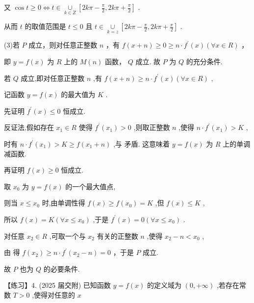 \documentclass[10pt]{article}
\newcommand*\circled[1]{\tikz[baseline=(char.base)]{\node[shape=circle,draw,inner sep=1.5pt] (char) {\small #1};}}
\begin{document}
又 \(\cos t \geq  0 \Leftrightarrow  t \in  \underset{k \in  Z}{ \cup  }\left\lbrack  {{2k\pi } - \frac{\pi }{2},{2k\pi } + \frac{\pi }{2}}\right\rbrack\) .

从而 \(t\) 的取值范围是 \(t \leq  0\) 且 \(t \in  \underset{k = z}{ \cup  }\left\lbrack  {{2k\pi } - \frac{\pi }{2},{2k\pi } + \frac{\pi }{2}}\right\rbrack\) .

(3)若 \(P\) 成立，则对任意正整数 \(n\) ，有 \(f\left( {x + n}\right)  \geq  0 \geq  n \cdot  {f}^{\prime }\left( x\right) \left( {\forall x \in  R}\right)\) ，

即 \(y = f\left( x\right)\) 为 \(R\) 上的 \(M\left( n\right)\) 函数， \(Q\) 成立. 故 \(P\) 为 \(Q\) 的充分条件.

若 \(Q\) 成立,即对任意正整数 \(n\) ,有 \(f\left( {x + n}\right)  \geq  n \cdot  {f}^{\prime }\left( x\right) \left( {\forall x \in  R}\right)\)  \circled{2} ,

记函数 \(y = f\left( x\right)\) 的最大值为 \(K\) .

先证明 \({f}^{\prime }\left( x\right)  \leq  0\) 恒成立.

反证法,假如存在 \({x}_{1} \in  R\) 使得 \({f}^{\prime }\left( {x}_{1}\right)  > 0\) ,则取正整数 \(n\) ,使得 \(n \cdot  {f}^{\prime }\left( {x}_{1}\right)  > K\) ,

时有 \(n \cdot  {f}^{\prime }\left( {x}_{1}\right)  > K \geq  f\left( {{x}_{1} + n}\right)\) ,与 \circled{2} 矛盾. 这意味着 \(y = f\left( x\right)\) 为 \(R\) 上的单调减函数.

再证明 \(f\left( x\right)  \geq  0\) 恒成立.

取 \({x}_{0}\) 为 \(y = f\left( x\right)\) 的一个最大值点,

则当 \(x \leq  {x}_{0}\) 时,由单调性得 \(f\left( x\right)  \geq  f\left( {x}_{0}\right)  = K\) ,但 \(f\left( x\right)  \leq  K\) ,

所以 \(f\left( x\right)  = K\left( {\forall x \leq  {x}_{0}}\right)\) ,于是 \({f}^{\prime }\left( x\right)  = 0\left( {\forall x \leq  {x}_{0}}\right)\) .

对任意 \({x}_{2} \in  R\) ,可取一个与 \({x}_{2}\) 有关的正整数 \(n\) ,使得 \({x}_{2} - n < {x}_{0}\) ,

由 \circled{2} 得 \(f\left( {x}_{2}\right)  \geq  n \cdot  {f}^{\prime }\left( {{x}_{2} - n}\right)  = 0\) ，于是 \(P\) 成立.

故 \(P\) 也为 \(Q\) 的必要条件.

【练习】4. (2025 届交附) 已知函数 \(y = f\left( x\right)\) 的定义域为 \(\left( {0, + \infty }\right)\) ,若存在常数 \(T > 0\) ,使得对任意的 \(x\)
\end{document}
